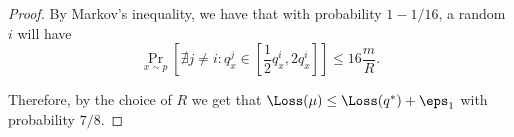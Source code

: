\begin{proof}
By Markov's inequality, we have that with probability $1-1/16$, a random $i$ will have $$\Pr_{x\sim p}\left[ \nexists j \neq i: q^j_x \in [\frac12 q^i_x,2 q^i_x] \right] \le 16 \frac m R.$$

Therefore, by the choice of $R$ we get that $\Loss(\mu) \le \Loss(q^*) + {\eps_1}$ with probability $7/8$.

\end{proof}